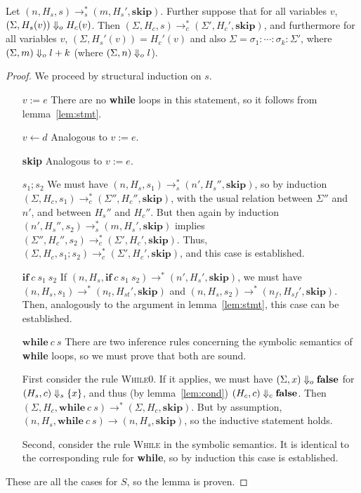 \begin{lemma} \label{lem:whil}
  Let $(n, H_s, s) \to_s^* (m, H_s', \mathbf{skip})$.
  Further suppose that for all variables $v$,
  $(\Sigma, H_s(v)) \Downarrow_o H_c(v)$.
  Then $(\Sigma, H_c, s) \to_c^* (\Sigma', H_c', \mathbf{skip})$,
  and furthermore for all variables $v$,
  $(\Sigma, H_s'(v)) = H_c'(v)$ and also
  $\Sigma = \sigma_1:\dotsb:\sigma_k:\Sigma'$,
  where $(\Sigma, m) \Downarrow_o l + k$
  (where $(\Sigma, n) \Downarrow_o l$).
\end{lemma}

\begin{proof}
  We proceed by structural induction on $s$.

  \begin{itemize}
  \item[$v := e$] There are no \textbf{while} loops in this statement,
    so it follows from lemma~\ref{lem:stmt}.
  \item[$v \leftarrow d$] Analogous to $v := e$.
  \item[\textbf{skip}] Analogous to $v := e$.
  \item[$s_1 ; s_2$] 
    We must have
    $(n, H_s, s_1) \to_s^* (n', H_s'', \mathbf{skip})$,
    so by induction
    $(\Sigma, H_c, s_1) \to_c^* (\Sigma'', H_c'', \mathbf{skip})$,
    with the usual relation between $\Sigma''$ and $n'$, and between
    $H_s''$ and $H_c''$.
    But then again by induction
    $(n', H_s'', s_2) \to_s^* (m, H_s', \mathbf{skip})$
    implies
    $(\Sigma'', H_c'', s_2) \to_c^* (\Sigma', H_c', \mathbf{skip})$.
    Thus,
    $(\Sigma, H_c, s_1;s_2) \to_c^* (\Sigma', H_c', \mathbf{skip})$,
    and this case is established.
  \item[$\mathbf{if}\:c\:s_1\:s_2$]
    If $(n, H_s, \mathbf{if}\:c\:s_1\:s_2) \to^* (n', H_s', \mathbf{skip})$,
    we must have $(n, H_s, s_1) \to^* (n_t, H_{st}', \mathbf{skip})$
    and $(n, H_s, s_2) \to^* (n_f, H_{sf}', \mathbf{skip})$.  Then,
    analogously to the argument in lemma~\ref{lem:stmt}, this case can
    be established.
  \item[$\mathbf{while}\:c\:s$]
    There are two inference rules concerning the symbolic semantics of
    \textbf{while} loops, so we must prove that both are sound.

    First consider the rule \textsc{While0}. If it applies, we must
    have $(\Sigma, x) \Downarrow_o \mathbf{false}$
    for $(H_s, c) \Downarrow_s \{ x \}$,
    and thus (by lemma~\ref{lem:cond})
    $(H_c, c) \Downarrow_c \mathbf{false}$.
    Then
    $(\Sigma, H_c, \mathbf{while}\:c\:s) \to^* (\Sigma, H_c, \mathbf{skip})$.
    But by assumption,
    $(n, H_s, \mathbf{while}\:c\:s) \to (n, H_s, \mathbf{skip})$,
    so the inductive statement holds.

    Second, consider the rule \textsc{While} in the symbolic
    semantics.  It is identical to the corresponding rule for
    \textbf{while}, so by induction this case is established.
  \end{itemize}

  These are all the cases for $S$, so the lemma is proven.
  
\end{proof}

